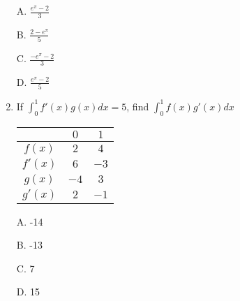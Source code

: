 \documentclass{article}
\numberwithin{equation}{section}
\begin{document}
\begin{enumerate}
    A. $\displaystyle \frac{e^\pi - 2}{3}$

    B. $\displaystyle \frac{2-e^\pi}{5}$

    C. $\displaystyle \frac{-e^\pi - 2}{3}$

    D. $\displaystyle \frac{e^\pi - 2}{5}$

    \item If $\displaystyle \int_{0}^{1} f'(x)g(x)dx = 5$, find $\displaystyle \int_{0}^{1} f(x)g'(x)dx$
    
    \begin{tabular}{||c c c||} 
    \hline
     & $0$ & $1$ \\ [0.5ex] 
    \hline\hline
    $f(x)$ & $2$ & $4$\\ 
    \hline
    $f'(x)$ & $6$ & $-3$\\
    \hline
    $g(x)$ & $-4$ & $3$\\
    \hline
    $g'(x)$ & $2$ & $-1$\\
    \hline
    \end{tabular}

    A. -14

    B. -13

    C. 7

    D. 15
\end{enumerate}

\newpage 
\end{document}
